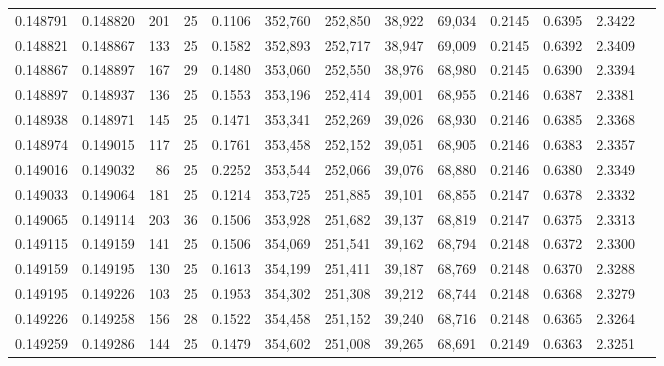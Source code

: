\begin{tabular}{rrrrrrrrrrrrr}
0.148791 & 0.148820 & 201 &  25 &                                     0.1106 & 352,760 & 252,850 &  38,922 &  69,034 & 0.2145 & 0.6395 & 2.3422 \\
0.148821 & 0.148867 & 133 &  25 &                                     0.1582 & 352,893 & 252,717 &  38,947 &  69,009 & 0.2145 & 0.6392 & 2.3409 \\
0.148867 & 0.148897 & 167 &  29 &                                     0.1480 & 353,060 & 252,550 &  38,976 &  68,980 & 0.2145 & 0.6390 & 2.3394 \\
0.148897 & 0.148937 & 136 &  25 &                                     0.1553 & 353,196 & 252,414 &  39,001 &  68,955 & 0.2146 & 0.6387 & 2.3381 \\
0.148938 & 0.148971 & 145 &  25 &                                     0.1471 & 353,341 & 252,269 &  39,026 &  68,930 & 0.2146 & 0.6385 & 2.3368 \\
0.148974 & 0.149015 & 117 &  25 &                                     0.1761 & 353,458 & 252,152 &  39,051 &  68,905 & 0.2146 & 0.6383 & 2.3357 \\
0.149016 & 0.149032 &  86 &  25 &                                     0.2252 & 353,544 & 252,066 &  39,076 &  68,880 & 0.2146 & 0.6380 & 2.3349 \\
0.149033 & 0.149064 & 181 &  25 &                                     0.1214 & 353,725 & 251,885 &  39,101 &  68,855 & 0.2147 & 0.6378 & 2.3332 \\
0.149065 & 0.149114 & 203 &  36 &                                     0.1506 & 353,928 & 251,682 &  39,137 &  68,819 & 0.2147 & 0.6375 & 2.3313 \\
0.149115 & 0.149159 & 141 &  25 &                                     0.1506 & 354,069 & 251,541 &  39,162 &  68,794 & 0.2148 & 0.6372 & 2.3300 \\
0.149159 & 0.149195 & 130 &  25 &                                     0.1613 & 354,199 & 251,411 &  39,187 &  68,769 & 0.2148 & 0.6370 & 2.3288 \\
0.149195 & 0.149226 & 103 &  25 &                                     0.1953 & 354,302 & 251,308 &  39,212 &  68,744 & 0.2148 & 0.6368 & 2.3279 \\
0.149226 & 0.149258 & 156 &  28 &                                     0.1522 & 354,458 & 251,152 &  39,240 &  68,716 & 0.2148 & 0.6365 & 2.3264 \\
0.149259 & 0.149286 & 144 &  25 &                                     0.1479 & 354,602 & 251,008 &  39,265 &  68,691 & 0.2149 & 0.6363 & 2.3251 \\

\end{tabular}
